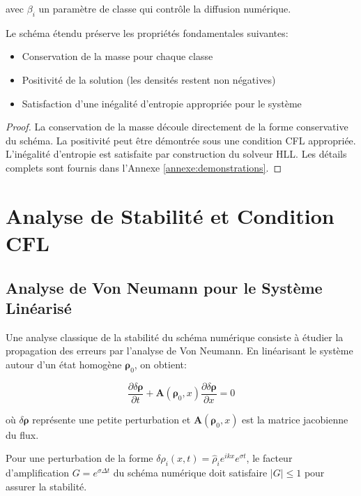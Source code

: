 avec $\beta_i$ un paramètre de classe qui contrôle la diffusion numérique.

\begin{theorem}
Le schéma étendu préserve les propriétés fondamentales suivantes:
\begin{itemize}
    \item Conservation de la masse pour chaque classe
    \item Positivité de la solution (les densités restent non négatives)
    \item Satisfaction d'une inégalité d'entropie appropriée pour le système
\end{itemize}
\end{theorem}

\begin{proof}
La conservation de la masse découle directement de la forme conservative du schéma. La positivité peut être démontrée sous une condition CFL appropriée. L'inégalité d'entropie est satisfaite par construction du solveur HLL. Les détails complets sont fournis dans l'Annexe \ref{annexe:demonstrations}.
\end{proof}

\section{Analyse de Stabilité et Condition CFL}
\label{sec:stabilite_cfl}

\subsection{Analyse de Von Neumann pour le Système Linéarisé}
\label{subsec:analyse_von_neumann}

Une analyse classique de la stabilité du schéma numérique consiste à étudier la propagation des erreurs par l'analyse de Von Neumann. En linéarisant le système autour d'un état homogène $\boldsymbol{\rho}_0$, on obtient:

\begin{equation}
\frac{\partial \delta\boldsymbol{\rho}}{\partial t} + \mathbf{A}(\boldsymbol{\rho}_0, x) \frac{\partial \delta\boldsymbol{\rho}}{\partial x} = 0
\end{equation}

où $\delta\boldsymbol{\rho}$ représente une petite perturbation et $\mathbf{A}(\boldsymbol{\rho}_0, x)$ est la matrice jacobienne du flux.

Pour une perturbation de la forme $\delta\rho_i(x,t) = \hat{\rho}_i e^{ikx} e^{\sigma t}$, le facteur d'amplification $G = e^{\sigma \Delta t}$ du schéma numérique doit satisfaire $|G| \leq 1$ pour assurer la stabilité.

